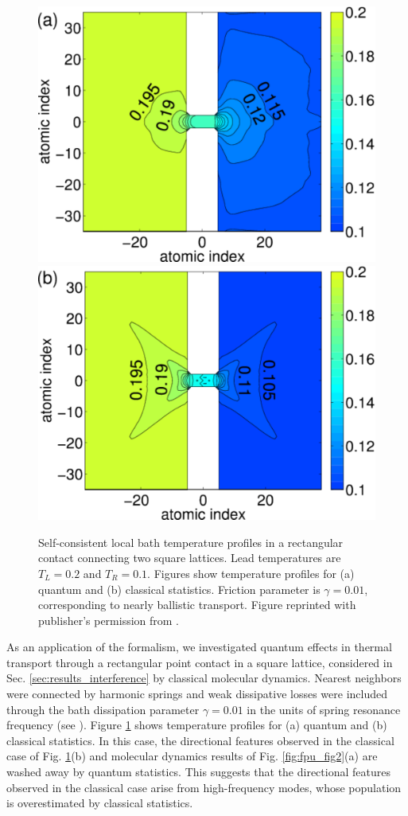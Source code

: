 \begin{figure}
 \includegraphics[width=.49\columnwidth]{pics/gf_fig7a.pdf}
 \includegraphics[width=.49\columnwidth]{pics/gf_fig7b.pdf}
 \caption{Self-consistent local bath temperature profiles in a rectangular contact connecting two square lattices. Lead temperatures are $T_L=0.2$ and $T_R=0.1$. Figures show temperature profiles for (a) quantum and (b) classical statistics. Friction parameter is $\gamma=0.01$, corresponding to nearly ballistic transport. Figure reprinted with publisher's permission from .}
 \label{fig:gf_fig7}
\end{figure}

As an application of the formalism, we investigated quantum effects in thermal transport through a rectangular point contact in a square lattice, considered in Sec. \ref{sec:results_interference} by classical molecular dynamics. Nearest neighbors were connected by harmonic springs and weak dissipative losses were included through the bath dissipation parameter $\gamma=0.01$ in the units of spring resonance frequency (see ). Figure \ref{fig:gf_fig7} shows temperature profiles for (a) quantum and (b) classical statistics. In this case, the directional features observed in the classical case of Fig. \ref{fig:gf_fig7}(b) and molecular dynamics results of Fig. \ref{fig:fpu_fig2}(a) are washed away by quantum statistics. This suggests that the directional features observed in the classical case arise from high-frequency modes, whose population is overestimated by classical statistics.

